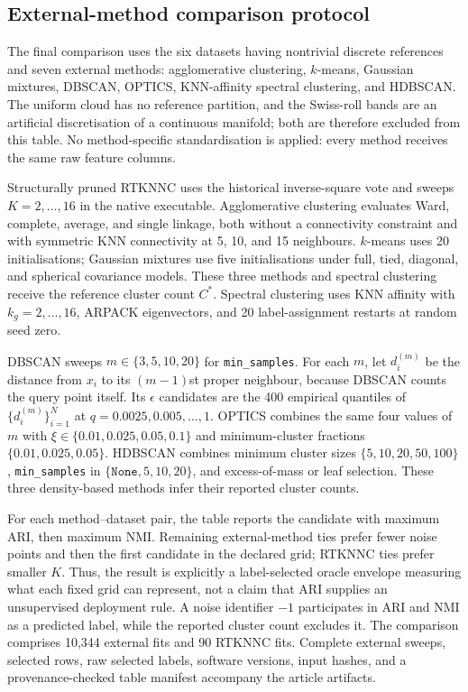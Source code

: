 \documentclass[pdflatex,sn-mathphys-num]{sn-jnl}
\begin{document}
\subsection{External-method comparison protocol}

The final comparison uses the six datasets having nontrivial discrete
references and seven external methods: agglomerative clustering, $k$-means,
Gaussian mixtures, DBSCAN, OPTICS, KNN-affinity spectral clustering, and
HDBSCAN.  The uniform cloud has no reference partition, and the Swiss-roll
bands are an artificial discretisation of a continuous manifold; both are
therefore excluded from this table.  No method-specific standardisation is
applied: every method receives the same raw feature columns.

Structurally pruned RTKNNC uses the historical inverse-square vote and sweeps
$K=2,\ldots,16$ in the native executable.  Agglomerative clustering evaluates
Ward, complete, average, and single linkage, both without a connectivity
constraint and with symmetric KNN connectivity at 5, 10, and 15 neighbours.
$k$-means uses 20 initialisations; Gaussian mixtures use five initialisations
under full, tied, diagonal, and spherical covariance models.  These three
methods and spectral clustering receive the reference cluster count $C^*$.
Spectral clustering uses KNN affinity with $k_g=2,\ldots,16$, ARPACK
eigenvectors, and 20 label-assignment restarts at random seed zero.

DBSCAN sweeps $m\in\{3,5,10,20\}$ for \texttt{min\_samples}.  For each $m$,
let $d_i^{(m)}$ be the distance from $x_i$ to its $(m-1)$st proper neighbour,
because DBSCAN counts the query point itself.  Its $\epsilon$ candidates are
the 400 empirical quantiles of $\{d_i^{(m)}\}_{i=1}^N$ at
$q=0.0025,0.005,\ldots,1$.  OPTICS combines the same four values of $m$ with
$\xi\in\{0.01,0.025,0.05,0.1\}$ and minimum-cluster fractions
$\{0.01,0.025,0.05\}$.  HDBSCAN combines minimum cluster sizes
$\{5,10,20,50,100\}$, \texttt{min\_samples} in
$\{\texttt{None},5,10,20\}$, and excess-of-mass or leaf selection.  These
three density-based methods infer their reported cluster counts.

For each method--dataset pair, the table reports the candidate with maximum
ARI, then maximum NMI.  Remaining external-method ties prefer fewer noise
points and then the first candidate in the declared grid; RTKNNC ties prefer
smaller $K$.  Thus, the result is explicitly a label-selected oracle envelope
measuring what each fixed grid can represent, not a claim that ARI supplies an
unsupervised deployment rule.  A noise identifier $-1$ participates in ARI
and NMI as a predicted label, while the reported cluster count excludes it.
The comparison comprises 10,344 external fits and 90 RTKNNC fits.  Complete
external sweeps, selected rows, raw selected labels, software versions, input
hashes, and a provenance-checked table manifest accompany the article
artifacts.
\end{document}
